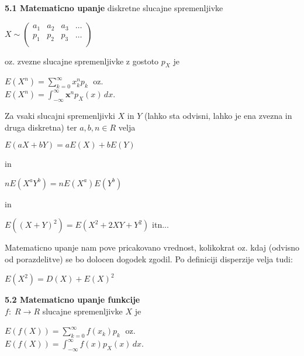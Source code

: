 \documentclass{article}
\begin{document}
\begin{multicols}{2}
	\textbf{5.1 Matematicno upanje} diskretne slucajne spremenljivke
	\begin{center}
		\begin{small}
			\begin{math}
				X \sim
				\begin{pmatrix}
					a_{1} & a_{2} & a_{3} & \dots \\
					p_{1} & p_{2} & p_{3} & \dots \\
				\end{pmatrix}
			\end{math}
		\end{small}
	\end{center}
	oz. zvezne slucajne spremenljivke z gostoto $p_X$ je
	\begin{center}
		\begin{math}
			E(X^n) = \sum_{k=0}^{\infty} x_k^n p_k\;
		\end{math} oz.\\
		\begin{math}
			E(X^n) = \int_{- \infty}^{ \infty} \textbf{x}^n p_X(x)\, dx
		\end{math}.
	\end{center}
	Za vsaki slucajni spremenljivki $X$ in $Y$ (lahko sta odvisni, lahko je ena zvezna in druga diskretna)
	ter $a, b, n \in R$ velja
	\begin{center}
		\begin{math}
			E(aX + bY) = aE(X) + bE(Y)
		\end{math}
	\end{center} in
	\begin{center}
		\begin{math}
			nE(X^a Y^b) = nE(X^a) E(Y^b)
		\end{math}
	\end{center} in
	\begin{center}
		\begin{math}
			E((X + Y)^2) = E(X^2 + 2XY + Y^2)
		\end{math} itn...
	\end{center}
	Matematicno upanje nam pove pricakovano vrednost, kolikokrat oz. kdaj (odvisno od porazdelitve)
	se bo dolocen dogodek zgodil. Po definiciji disperzije velja tudi:
	\begin{center}
		$E(X^2) = D(X) + E(X)^2$
	\end{center}

	\textbf{5.2 Matematicno upanje funkcije}\\
	$f:\; R \rightarrow R$ slucajne spremenljivke $X$ je
	\begin{center}
		\begin{math}
			E(f(X)) = \sum_{k=0}^{\infty} f(x_k) p_k\;
		\end{math} oz.\\
		\begin{math}
			E(f(X)) = \int_{- \infty}^{ \infty} f(x) p_X (x)\, dx
		\end{math}.
	\end{center}


\end{multicols}
\end{document}
